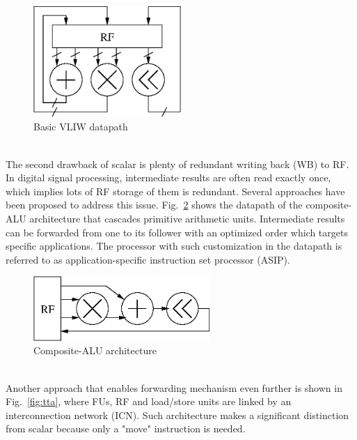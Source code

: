         \vspace{\textfig}
        \begin{figure}[!ht] 
            \centering
            \includegraphics[width=0.5\textwidth]{./figs/vliw.eps}
            \caption{Basic VLIW datapath}
            \label{fig:vliw}
        \end{figure}
        \\\indent
        The second drawback of scalar is plenty of redundant writing back (WB) to RF. 
        In digital signal processing, intermediate results are often read exactly once, which implies lots of RF storage of them is redundant.
        Several approaches have been proposed to address this issue.
        Fig.~\ref{fig:cascade} shows the datapath of the composite-ALU architecture that cascades primitive arithmetic units. 
        Intermediate results can be forwarded from one to its follower with an optimized order which targets specific applications.
        The processor with such customization in the datapath is referred to as application-specific instruction set processor (ASIP).
        \vspace{\textfig}
        \begin{figure}[!ht] 
            \centering
            \includegraphics[width=0.6\textwidth]{./figs/cascade.eps}
            \caption{Composite-ALU architecture}
            \label{fig:cascade}
        \end{figure}
        \\\indent
        Another approach that enables forwarding mechanism even further is shown in Fig.~\ref{fig:tta}, where FUs, RF and load/store units are linked by an interconnection network (ICN).
        Such architecture makes a significant distinction from scalar because only a "move" instruction is needed. 
